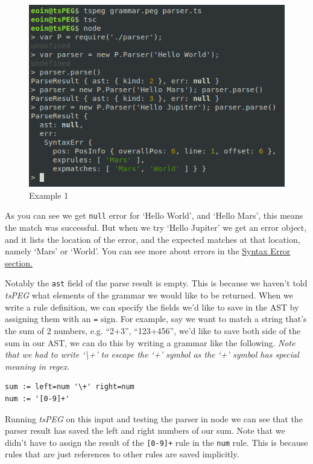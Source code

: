 \begin{figure}[ht]
\centering
    \includegraphics[scale=0.7]{src/app1assets/example1.png}
\caption{Example 1}
\end{figure}

As you can see we get \texttt{null} error for `Hello World', and `Hello
Mars', this means the match was successful. But when we try `Hello
Jupiter' we get an error object, and it lists the location of the error,
and the expected matches at that location, namely `Mars' or `World'. You
can see more about errors in the
\protect\hyperlink{syntax-errors}{Syntax Error section.}

Notably the \texttt{ast} field of the parse result is empty. This is
because we haven't told \emph{tsPEG} what elements of the grammar we
would like to be returned. When we write a rule definition, we can
specify the fields we'd like to save in the AST by assigning them with
an \texttt{=} sign. For example, say we want to match a string that's
the sum of 2 numbers, e.g. ``2+3'', ``123+456'', we'd like to save both
side of the sum in our AST, we can do this by writing a grammar like the
following. \emph{Note that we had to write `\textbackslash{}+' to escape
the `+' symbol as the `+' symbol has special meaning in regex}.

\begin{verbatim}
sum := left=num '\+' right=num
num := '[0-9]+'
\end{verbatim}

Running \emph{tsPEG} on this input and testing the parser in node we can
see that the parser result has saved the left and right numbers of our
sum. Note that we didn't have to assign the result of the
\texttt{{[}0-9{]}+} rule in the \texttt{num} rule. This is because rules
that are just references to other rules are saved implicitly.

